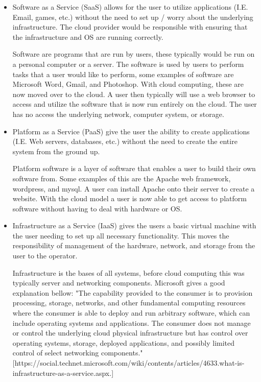 \documentclass[12pt]{article}
\begin{document}
\begin{itemize}
    \item Software as a Service (SaaS) allows for the user to utilize applications (I.E. Email, games, etc.) without the need to set up / worry about the underlying infrastructure. The cloud provider would be responsible with ensuring that the infrastructure and OS are running correctly.

        Software are programs that are run by users, these typically would be run on a personal computer or a server. The software is used by users to perform tasks that a user would like to perform, some examples of software are Microsoft Word, Gmail, and Photoshop. With cloud computing, these are now moved over to the cloud. A user then typically will use a web browser to access and utilize the software that is now run entirely on the cloud. The user has no access the underlying network, computer system, or storage.

    \item Platform as a Service (PaaS) give the user the ability to create applications (I.E. Web servers, databases, etc.) without the need to create the entire system from the ground up.

        Platform software is a layer of software that enables a user to build their own software from. Some examples of this are the Apache web framework, wordpress, and mysql. A user can install Apache onto their server to create a website. With the cloud model a user is now able to get access to platform software without having to deal with hardware or OS.

    \item Infrastructure as a Service (IaaS) gives the users a basic virtual machine with the user needing to set up all necessary functionality. This moves the responsibility of management of the hardware, network, and storage from the user to the operator.

        Infrastructure is the bases of all systems, before cloud computing this was typically server and networking components. Microsoft gives a good explanation bellow:
        "The capability provided to the consumer is to provision processing, storage, networks, and other fundamental computing resources where the consumer is able to deploy and run arbitrary software, which can include operating systems and applications. The consumer does not manage or control the underlying cloud physical infrastructure but has control over operating systems, storage, deployed applications, and possibly limited control of select networking components."[https://social.technet.microsoft.com/wiki/contents/articles/4633.what-is-infrastructure-as-a-service.aspx.]



\end{itemize}
\end{document}
